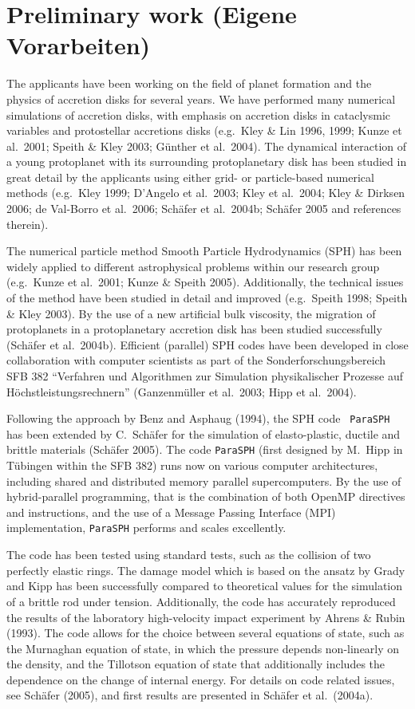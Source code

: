 %
\section{Preliminary work (Eigene Vorarbeiten)}
%
The applicants have been working on the field of planet formation and the
physics of accretion disks for several years.  We have performed many
numerical simulations of accretion disks, with emphasis on accretion disks
in cataclysmic variables and protostellar accretions disks (e.g.\ Kley \&
Lin 1996, 1999; Kunze et al.\ 2001; Speith \& Kley 2003; G\"unther et al.\
2004).  The dynamical interaction of a young protoplanet with its
surrounding protoplanetary disk has been studied in great detail by the
applicants using either grid- or particle-based numerical methods (e.g.\
Kley 1999; D'Angelo et al.\ 2003; Kley et al.\ 2004; Kley \& Dirksen 2006;
de Val-Borro et al.\ 2006; Sch\"afer et al.~2004b; Sch\"afer 2005 and
references therein).
%

The numerical particle method Smooth Particle Hydrodynamics (SPH) has been
widely applied to different astrophysical problems within our research group
(e.g.\ Kunze et al.\ 2001; Kunze \& Speith 2005).  Additionally, the
technical issues of the method have been studied in detail and improved
(e.g.\ Speith 1998; Speith \& Kley 2003).  By the use of a new artificial
bulk viscosity, the migration of protoplanets in a protoplanetary accretion
disk has been studied successfully (Sch\"afer et al.~2004b). Efficient
(parallel) SPH codes have been developed in close collaboration with
computer scientists as part of the Sonderforschungsbereich SFB 382
``Verfahren und Algorithmen zur Simulation physikalischer Prozesse auf
H\"ochstleistungsrechnern'' (Ganzenm\"uller et al.~2003; Hipp et al.~2004).
%

Following the approach by Benz and Asphaug (1994), the SPH code {\tt
ParaSPH} has been extended by C.~Sch\"afer for the simulation of
elasto-plastic, ductile and brittle materials (Sch\"afer 2005). The code
{\tt ParaSPH} (first designed by M.~Hipp in T\"ubingen within the SFB 382)
runs now on various computer architectures, including shared and distributed
memory parallel supercomputers. By the use of hybrid-parallel programming,
that is the combination of both OpenMP directives and instructions, and the
use of a Message Passing Interface (MPI) implementation, {\tt ParaSPH}
performs and scales excellently.

The code has been tested using standard tests, such as the collision of two
perfectly elastic rings. The damage model which is based on the ansatz by
Grady and Kipp has been successfully compared to theoretical values for the
simulation of a brittle rod under tension. Additionally, the code has
accurately reproduced the results of the laboratory high-velocity impact
experiment by Ahrens \& Rubin (1993). The code allows for the choice between
several equations of state, such as the Murnaghan equation of state, in
which the pressure depends non-linearly on the density, and the Tillotson
equation of state that additionally includes the dependence on the change of
internal energy.  For details on code related issues, see Sch\"afer (2005),
and first results are presented in Sch\"afer et al.~(2004a).

